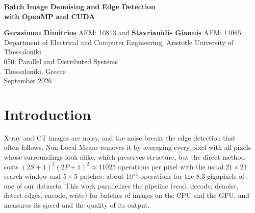 \documentclass[10pt,a4paper]{article}
\begin{document}
\begin{center}
	{\LARGE\bfseries Batch Image Denoising and Edge Detection\\[2pt] with OpenMP and CUDA\par}
	\vspace{0.3cm}
	{\large\textbf{Gerasimou Dimitrios} AEM: 10813 \quad and \quad \textbf{Stavrianidis Giannis} AEM: 11065\\}
	\vspace{0.2cm}
	Department of Electrical and Computer Engineering, Aristotle University of Thessaloniki\\
	050: Parallel and Distributed Systems\\ \vspace{0.2cm}
	Thessaloniki, Greece\\ September 2026
\end{center}

\vspace{0.1cm}
\thispagestyle{empty}

\begin{abstract}
\small
For this assignment, we present a batch tool that denoises grayscale images with \emph{Non-Local Means} (NLM) and extracts their edges
with the \emph{Canny} detector, on multicore CPUs (\textbf{OpenMP}) and on NVIDIA GPUs (\textbf{CUDA}).
The noise level and the filter strength are estimated for every image, and the CPU and the GPU produce identical \textbf{deterministic} output.
The main techniques are integral images for the patch distances, row \textbf{bands} of 16--32 rows drawn from one shared pool
on the CPU, and a shared-memory tile kernel with a register sliding window, a batch pipeline and a two-slot CUDA stream driver on the GPU.
On an Intel i7-11800H and an RTX~3060 Laptop GPU, tested on \num{36669} images of four datasets (two chest X-ray collections with added
Poisson noise, AAPM low-dose CT, and the real noise of 2DeteCT), denoising runs at 1.1\,Mpx/s on one thread, \mbox{7.0--7.3\,Mpx/s} on 16
threads and \mbox{143--149\,Mpx/s} on the GPU: \textbf{20--21$\times$ faster than the CPU and 128--139$\times$ faster than one thread}.
The PSNR rises by 4.5--9.2\,dB on average, and the edge F1 score on 2DeteCT from 0.25 to 0.75.
\end{abstract}

\section{Introduction}
X-ray and CT images are noisy, and the noise breaks the edge detection that often follows. Non-Local Means \cite{buades05,buades11} removes
it by averaging every pixel with all pixels whose surroundings look alike, which preserves structure, but the direct method costs
$(2S{+}1)^2(2P{+}1)^2\approx\num{11025}$ operations per pixel with the usual $21\times21$ search window and $5\times5$ patches: about
$10^{14}$ operations for the \num{8.3} gigapixels of one of our datasets. This work parallelizes the pipeline (read, decode, denoise, detect
edges, encode, write) for batches of images on the CPU and the GPU, and measures its speed and the quality of its output.
\end{document}
